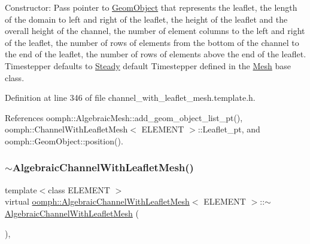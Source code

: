 Constructor\+: Pass pointer to \hyperlink{classoomph_1_1GeomObject}{Geom\+Object} that represents the leaflet, the length of the domain to left and right of the leaflet, the height of the leaflet and the overall height of the channel, the number of element columns to the left and right of the leaflet, the number of rows of elements from the bottom of the channel to the end of the leaflet, the number of rows of elements above the end of the leaflet. Timestepper defaults to \hyperlink{classoomph_1_1Steady}{Steady} default Timestepper defined in the \hyperlink{classoomph_1_1Mesh}{Mesh} base class. 



Definition at line 346 of file channel\+\_\+with\+\_\+leaflet\+\_\+mesh.\+template.\+h.



References oomph\+::\+Algebraic\+Mesh\+::add\+\_\+geom\+\_\+object\+\_\+list\+\_\+pt(), oomph\+::\+Channel\+With\+Leaflet\+Mesh$<$ E\+L\+E\+M\+E\+N\+T $>$\+::\+Leaflet\+\_\+pt, and oomph\+::\+Geom\+Object\+::position().

\mbox{\label{classoomph_1_1AlgebraicChannelWithLeafletMesh_a5b7c6a5f91427eae728c397b38de7c54}} 
\subsubsection{\texorpdfstring{$\sim$\+Algebraic\+Channel\+With\+Leaflet\+Mesh()}{~AlgebraicChannelWithLeafletMesh()}}
{\footnotesize\ttfamily template$<$class E\+L\+E\+M\+E\+NT $>$ \\
virtual \hyperlink{classoomph_1_1AlgebraicChannelWithLeafletMesh}{oomph\+::\+Algebraic\+Channel\+With\+Leaflet\+Mesh}$<$ E\+L\+E\+M\+E\+NT $>$\+::$\sim$\hyperlink{classoomph_1_1AlgebraicChannelWithLeafletMesh}{Algebraic\+Channel\+With\+Leaflet\+Mesh} (\begin{DoxyParamCaption}{ }\end{DoxyParamCaption})\hspace{0.3cm}{\ttfamily [inline]}, {\ttfamily [virtual]}}




